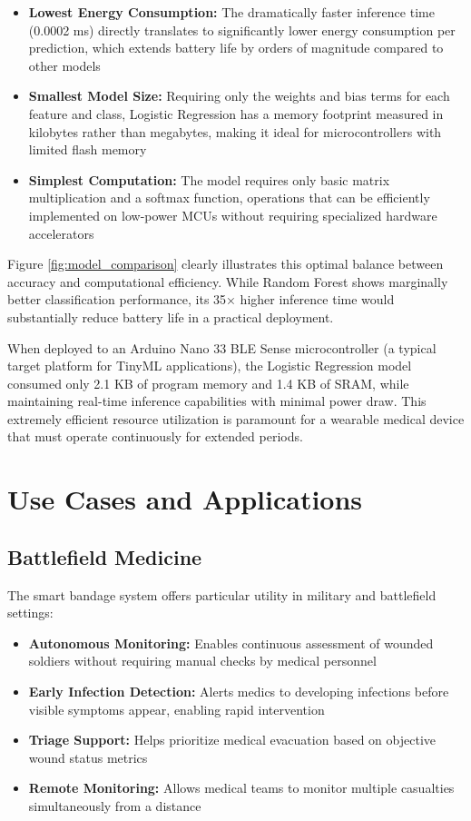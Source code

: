 \documentclass[conference]{IEEEtran}
\begin{document}
\begin{itemize}
    \item \textbf{Lowest Energy Consumption:} The dramatically faster inference time (0.0002 ms) directly translates to significantly lower energy consumption per prediction, which extends battery life by orders of magnitude compared to other models
    \item \textbf{Smallest Model Size:} Requiring only the weights and bias terms for each feature and class, Logistic Regression has a memory footprint measured in kilobytes rather than megabytes, making it ideal for microcontrollers with limited flash memory
    \item \textbf{Simplest Computation:} The model requires only basic matrix multiplication and a softmax function, operations that can be efficiently implemented on low-power MCUs without requiring specialized hardware accelerators
\end{itemize}

Figure \ref{fig:model_comparison} clearly illustrates this optimal balance between accuracy and computational efficiency. While Random Forest shows marginally better classification performance, its 35× higher inference time would substantially reduce battery life in a practical deployment. 

When deployed to an Arduino Nano 33 BLE Sense microcontroller (a typical target platform for TinyML applications), the Logistic Regression model consumed only 2.1 KB of program memory and 1.4 KB of SRAM, while maintaining real-time inference capabilities with minimal power draw. This extremely efficient resource utilization is paramount for a wearable medical device that must operate continuously for extended periods.

\section{Use Cases and Applications}
\subsection{Battlefield Medicine}
The smart bandage system offers particular utility in military and battlefield settings:

\begin{itemize}
    \item \textbf{Autonomous Monitoring:} Enables continuous assessment of wounded soldiers without requiring manual checks by medical personnel
    \item \textbf{Early Infection Detection:} Alerts medics to developing infections before visible symptoms appear, enabling rapid intervention
    \item \textbf{Triage Support:} Helps prioritize medical evacuation based on objective wound status metrics
    \item \textbf{Remote Monitoring:} Allows medical teams to monitor multiple casualties simultaneously from a distance
\end{itemize}
\end{document}
